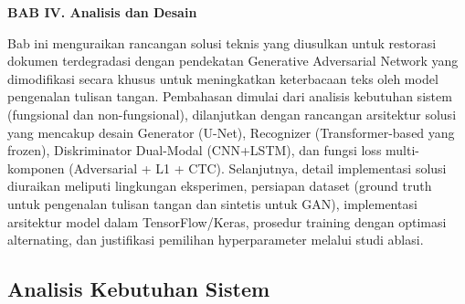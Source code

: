 \documentclass[12pt,a4paper]{article}
\begin{document}

\vspace{2cm}
\begin{center}
{\fontsize{14}{16.8}\selectfont\textbf{BAB IV. Analisis dan Desain}}\\[1em]
\end{center}
\label{sec:analisis}
\setcounter{section}{4}
\setcounter{subsection}{0}
\vspace{2em}
\label{subsec:analisis-desain}
\vspace{0.8em}


\renewcommand{\thesection}{\Roman{section}}
\renewcommand{\thesubsection}{\thesection.\arabic{subsection}}
\renewcommand{\thesubsubsection}{\thesubsection.\arabic{subsubsection}}

Bab ini menguraikan rancangan solusi teknis yang diusulkan untuk restorasi dokumen terdegradasi dengan pendekatan Generative Adversarial Network yang dimodifikasi secara khusus untuk meningkatkan keterbacaan teks oleh model pengenalan tulisan tangan. Pembahasan dimulai dari analisis kebutuhan sistem (fungsional dan non-fungsional), dilanjutkan dengan rancangan arsitektur solusi yang mencakup desain Generator (U-Net), Recognizer (Transformer-based yang frozen), Diskriminator Dual-Modal (CNN+LSTM), dan fungsi loss multi-komponen (Adversarial + L1 + CTC). Selanjutnya, detail implementasi solusi diuraikan meliputi lingkungan eksperimen, persiapan dataset (ground truth untuk pengenalan tulisan tangan dan sintetis untuk GAN), implementasi arsitektur model dalam TensorFlow/Keras, prosedur training dengan optimasi alternating, dan justifikasi pemilihan hyperparameter melalui studi ablasi.

\subsection{Analisis Kebutuhan Sistem} %
\end{document}
